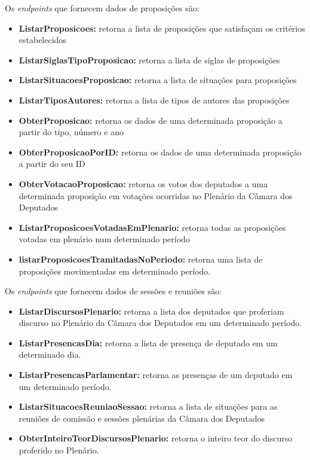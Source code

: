 \begin{apendicesenv}
Os \textit{endpoints} que fornecem dados de proposições são:

\begin{itemize}
    \item \textbf{ListarProposicoes:} retorna a lista de proposições que satisfaçam os critérios estabelecidos
    \item \textbf{ListarSiglasTipoProposicao:} retorna a lista de siglas de proposições
    \item \textbf{ListarSituacoesProposicao:} retorna a lista de situações para proposições
    \item \textbf{ListarTiposAutores:} retorna a lista de tipos de autores das proposições
    \item \textbf{ObterProposicao:} retorna os dados de uma determinada proposição a partir do tipo, número e ano
    \item \textbf{ObterProposicaoPorID:} retorna os dados de uma determinada proposição a partir do seu ID
    \item \textbf{ObterVotacaoProposicao:} retorna os votos dos deputados a uma determinada proposição em votações ocorridas no Plenário da Câmara dos Deputados
    \item \textbf{ListarProposicoesVotadasEmPlenario:} retorna todas as proposições votadas em plenário num determinado período
    \item \textbf{listarProposicoesTramitadasNoPeriodo:} retorna uma lista de proposições movimentadas em determinado período.
\end{itemize}

Os \textit{endpoints} que fornecem dados de sessões e reuniões são:

\begin{itemize}
    \item \textbf{ListarDiscursosPlenario:} retorna a lista dos deputados que proferiam discurso no Plenário da Cãmara dos Deputados em um determinado período.
    \item \textbf{ListarPresencasDia:} retorna a lista de presença de deputado em um determinado dia.
    \item \textbf{ListarPresencasParlamentar:} retorna as presenças de um deputado em um determinado período.
    \item \textbf{ListarSituacoesReuniaoSessao:} retorna a lista de situações para as reuniões de comissão e sessões plenárias da Câmara dos Deputados
    \item \textbf{ObterInteiroTeorDiscursosPlenario:} retorna o inteiro teor do discurso proferido no Plenário.
\end{itemize}


\end{apendicesenv}
